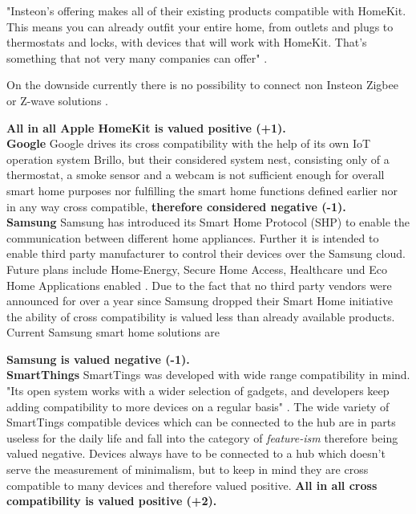 				"Insteon’s offering makes all of their existing products compatible with HomeKit. This means you can already outfit your entire home, from outlets and plugs to thermostats and locks, with devices that will work with HomeKit. That’s something that not very many companies can offer" \parencite{HomeKitFutureProofness}.

				On the downside currently there is no possibility to connect non Insteon Zigbee or Z-wave solutions \parencite{HomeKitFutureProofness}.

				\textbf{All in all Apple HomeKit is valued positive (+1).}\\

			\textbf{Google}
				Google drives its cross compatibility with the help of its own IoT operation system Brillo, but their considered system nest, consisting only of a thermostat, a smoke sensor and a webcam is not sufficient enough for overall smart home purposes nor fulfilling the smart home functions defined earlier nor in any way cross compatible, \textbf{therefore considered negative (-1).}\\

			\textbf{Samsung}
				Samsung has introduced its Smart Home Protocol (SHP) to enable the communication between different home appliances. Further it is intended to enable third party manufacturer to control their devices over the Samsung cloud. Future plans include Home-Energy, Secure Home Access, Healthcare und Eco Home Applications enabled \parencite{SHP}. Due to the fact that no third party vendors were announced for over a year since Samsung dropped their Smart Home initiative the ability of cross compatibility is valued less than already available products. Current Samsung smart home solutions are 

				\textbf{Samsung is valued negative (-1).}\\

			\textbf{SmartThings}
				SmartTings was developed with wide range compatibility in mind. "Its open system works with a wider selection of gadgets, and developers keep adding compatibility to more devices on a regular basis" \parencite{SmartThingsCompat}. The wide variety of SmartTings compatible devices which can be connected to the hub are in parts useless for the daily life and fall into the category of \textit{feature-ism} therefore being valued negative. Devices always have to be connected to a hub which doesn't serve the measurement of minimalism, but to keep in mind they are cross compatible to many devices and therefore valued positive. \textbf{All in all cross compatibility is valued positive (+2).}\\

